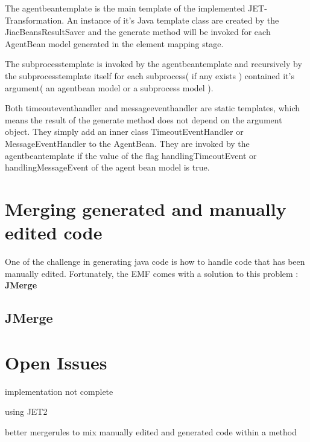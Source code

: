 The agentbeantemplate is the main template of the implemented JET-Transformation. An instance of it's Java template class are created by the JiacBeansResultSaver and the generate method will be invoked for each AgentBean model generated in the element mapping stage. 

The subprocesstemplate is invoked by the agentbeantemplate and recursively by the subprocesstemplate itself for each subprocess( if any exists ) contained it's argument( an agentbean model or a subprocess model ). 

Both timeouteventhandler and messageeventhandler are static templates, which means the result of the generate method does not depend on the argument object. They simply add an inner class TimeoutEventHandler or MessageEventHandler to the AgentBean. They are invoked by the agentbeantemplate if the value of the flag handlingTimeoutEvent or handlingMessageEvent of the agent bean model is true.


\section{Merging generated and manually edited code}
One of the challenge in generating java code is how to handle code that has been manually edited. Fortunately, the EMF comes with a solution to this problem : \textbf{JMerge}\cite{JMERGEFAQ}

\subsection{JMerge}
\section{Open Issues}
implementation not complete


using JET2


better mergerules to mix manually edited and generated code within a method



